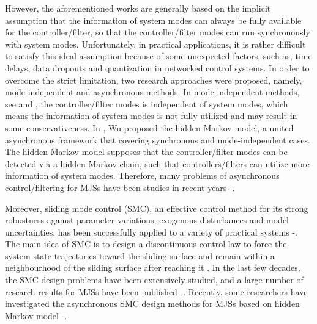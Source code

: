 \documentclass[conference]{IEEEtran}
\begin{document}
	However, the aforementioned works are generally based on the implicit assumption that the information of system modes can always be  fully available for the controller/filter, so that the controller/filter modes can run synchronously with system modes. Unfortunately, in practical applications, it is rather difficult to satisfy this ideal assumption because of some unexpected factors, such as, time delays, data dropouts and quantization in networked control systems. In order to overcome the strict limitation, two research approaches were proposed, namely, mode-independent and asynchronous methods. In mode-independent methods, see \cite{mode_independent_T} and \cite{mode_independent_wuhuaining}, the controller/filter modes is independent of system modes, which means the information of system modes is not fully utilized and may result in some conservativeness. In \cite{passive_wu}, Wu proposed the hidden Markov model, a united asynchronous framework that covering synchronous and mode-independent cases. The hidden Markov model supposes that the controller/filter modes can be detected via a hidden Markov chain, such that controllers/filters can utilize more information of system modes.  Therefore, many problems of asynchronous control/filtering for MJSs have been studies in recent years \cite{Hinfty_shenying}-\cite{continus_filter_dongshanling}. 
	
	
	Moreover, sliding mode control (SMC), an effective control method for its strong robustness against parameter variations,  exogenous disturbances and model uncertainties, has been successfully applied to a variety of practical systems \cite{smc-motor}-\cite{smc-robot}.  The main idea of SMC is to design a discontinuous control law to force the system state trajectories toward the sliding surface and remain within a neighbourhood of the  sliding surface after reaching it \cite{smc-book}. In the last few decades, the SMC design problems have been extensively studied, and a large number of  research results for MJSs have been published \cite{smc-semiMarkov}-\cite{smc-nonlinear}. Recently, some researchers have investigated the asynchronous SMC design methods for MJSs based on hidden Markov model \cite{songjun-smc}-\cite{smc-qi}. 
	
	
	
\end{document}
